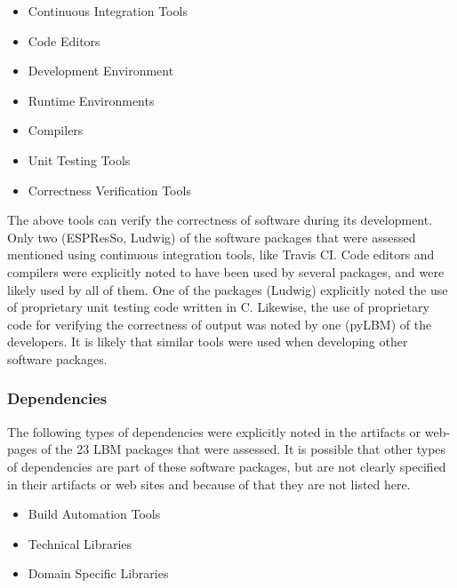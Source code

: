 \documentclass[final, 3p, times, authoryear]{elsarticle}
\begin{document}
	\begin{multicols}{2}	
		\begin{itemize}
			
			\item Continuous Integration Tools
			\item Code Editors
			\item Development Environment
			\item Runtime Environments
			\item Compilers
			\item Unit Testing Tools
			\item Correctness Verification Tools
			
		\end{itemize}
	\end{multicols}

The above tools can verify the correctness of software during its development.
Only two (ESPResSo, Ludwig) of the software packages that were assessed
mentioned using continuous integration tools, like Travis CI. Code editors and
compilers were explicitly noted to have been used by several packages, and were
likely used by all of them. One of the packages (Ludwig) explicitly noted the
use of proprietary unit testing code written in C. Likewise, the use of
proprietary code for verifying the correctness of output was noted by one
(pyLBM) of the developers. It is likely that similar tools were used when
developing other software packages. 

\subsubsection{Dependencies}

The following types of dependencies were explicitly noted in the artifacts or
web-pages of the 23 LBM packages that were assessed. It is possible that other
types of dependencies are part of these software packages, but are not clearly
specified in their artifacts or web sites and because of that they are not
listed here.

	\begin{multicols}{2}	
		\begin{itemize}
			
			\item Build Automation Tools
			\item Technical Libraries
			\item Domain Specific Libraries
		
		\end{itemize}
	\end{multicols}
\end{document}

